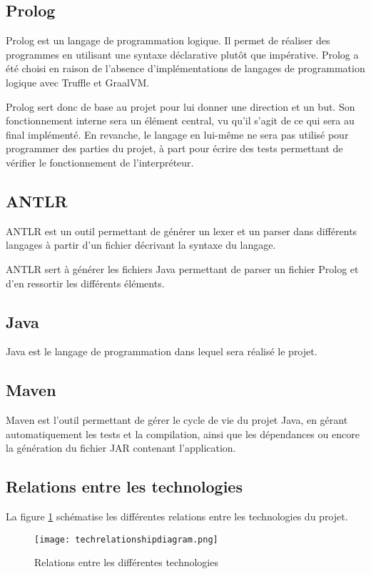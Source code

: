 \documentclass[../report.tex]{subfiles}
\begin{document}
\subsection{Prolog}
Prolog est un langage de programmation logique. Il permet de réaliser des programmes en utilisant une syntaxe déclarative plutôt que impérative. Prolog a été choisi en raison de l'absence d'implémentations de langages de programmation logique avec Truffle et GraalVM.

Prolog sert donc de base au projet pour lui donner une direction et un but. Son fonctionnement interne sera un élément central, vu qu'il s'agit de ce qui sera au final implémenté. En revanche, le langage en lui-même ne sera pas utilisé pour programmer des parties du projet, à part pour écrire des tests permettant de vérifier le fonctionnement de l'interpréteur.
\subsection{ANTLR}
ANTLR est un outil permettant de générer un lexer et un parser dans différents langages à partir d'un fichier décrivant la syntaxe du langage.

ANTLR sert à générer les fichiers Java permettant de parser un fichier Prolog et d'en ressortir les différents éléments.
\subsection{Java}
Java est le langage de programmation dans lequel sera réalisé le projet.
\subsection{Maven}
Maven est l'outil permettant de gérer le cycle de vie du projet Java, en gérant automatiquement les tests et la compilation, ainsi que les dépendances ou encore la génération du fichier JAR contenant l'application.
\subsection{Relations entre les technologies}
La figure \ref{fig:technologiesRelationship} schématise les différentes relations entre les technologies du projet.
\begin{figure}[h]
    \centering
    \texttt{[image: techrelationshipdiagram.png]}
    \caption{Relations entre les différentes technologies}
    \label{fig:technologiesRelationship}
\end{figure}
\end{document}
